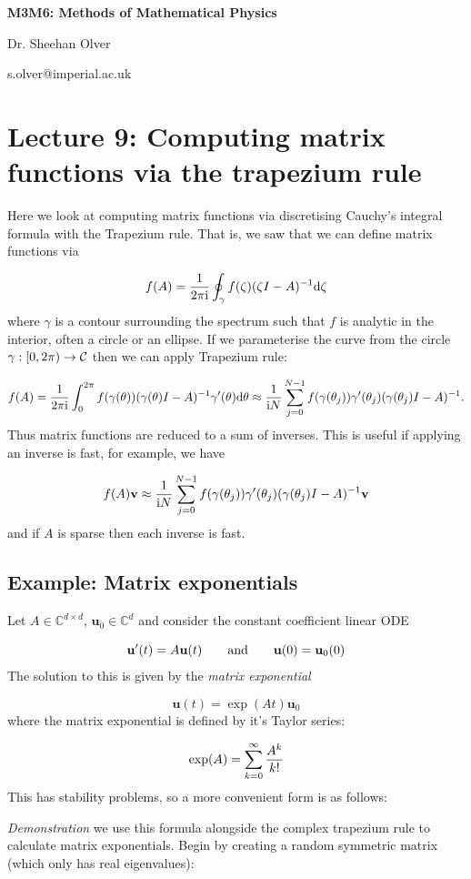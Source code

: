 \documentclass[12pt,a4paper]{article}
\def\D{ {\rm d} }
\def\I{ {\rm i} }
\def\CC{ {\cal C} }
\def\vc#1{ {\mathbf #1} }
\begin{document}
\textbf{M3M6: Methods of Mathematical Physics}

Dr. Sheehan Olver

s.olver@imperial.ac.uk

\section{Lecture 9: Computing matrix functions via the trapezium rule}
Here we look at computing matrix functions via discretising Cauchy's integral formula with the Trapezium rule. That is, we saw that we can define matrix functions via

\[
f(A) = {1 \over 2 \pi \I} \oint_\gamma f(\zeta) (\zeta I - A)^{-1} \D \zeta
\]
where $\gamma$ is a contour surrounding the spectrum such that $f$ is analytic in the interior, often a circle or an ellipse. If we parameterise the curve from the circle $\gamma : [0,2 \pi) \rightarrow \CC$ then we can apply Trapezium rule:

\[
f(A) = {1 \over 2 \pi \I} \int_0^{2\pi}  f(\gamma(\theta)) (\gamma(\theta) I - A)^{-1}\gamma'(\theta)  \D \theta \approx 
{1 \over \I N}  \sum_{j=0}^{N-1} f(\gamma(\theta_j)) \gamma'(\theta_j) (\gamma(\theta_j) I - A)^{-1}.
\]
Thus matrix functions are reduced to a sum of inverses. This is useful if applying an inverse is fast, for example, we have

\[
f(A) \vc v \approx {1 \over \I N}  \sum_{j=0}^{N-1} f(\gamma(\theta_j)) \gamma'(\theta_j) (\gamma(\theta_j) I - A)^{-1} \vc v
\]
and if $A$ is sparse then each inverse is fast. 

\subsection{Example: Matrix exponentials}
Let $A \in {\mathbb C}^{d \times d}$,   ${\mathbf u}_0 \in {\mathbb C}^d$ and consider the constant coefficient linear ODE

\[
    {\mathbf u}'(t) = A {\mathbf u}(t)\qquad\hbox{and}\qquad {\mathbf u}(0) = {\mathbf u}_0(0)
\]
The solution to this is given by the \emph{matrix exponential}

\[
    {\mathbf u}(t) = \exp(A t) {\mathbf u}_0
\]
where the matrix exponential is defined by it's Taylor series:

\[
    \exp(A) = \sum_{k=0}^\infty {A^k \over k!}
\]
This has stability problems, so a more convenient form is as follows:

\emph{Demonstration} we use this formula alongside the complex trapezium rule to calculate matrix exponentials.  Begin by creating a random symmetric matrix (which only has real eigenvalues):
\end{document}
